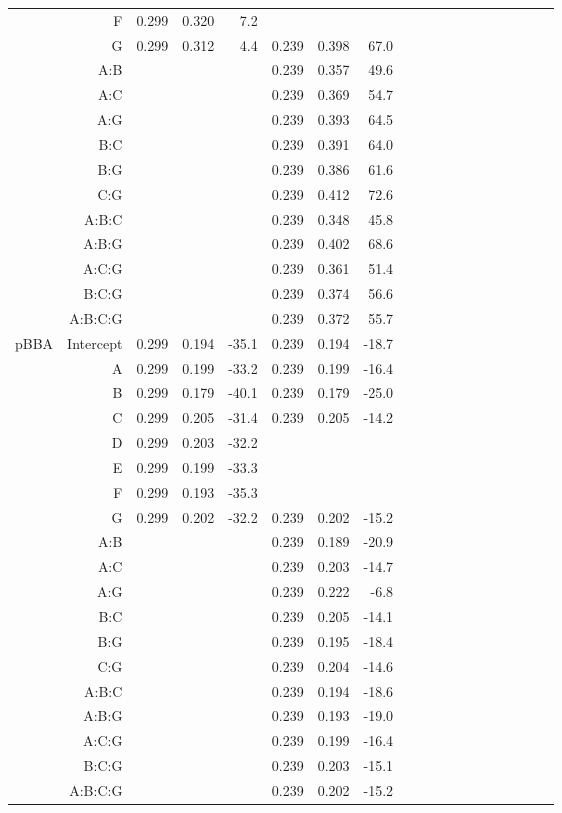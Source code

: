 \begin{table}
\begin{tabular}{lrrrrrrrrrrrrrrrrrr}
 & F & 0.299 & 0.320 & 7.2 &  &  &  \\
 & G & 0.299 & 0.312 & 4.4 & 0.239 & 0.398 & 67.0 \\
 & A:B &  &  &  & 0.239 & 0.357 & 49.6 \\
 & A:C &  &  &  & 0.239 & 0.369 & 54.7 \\
 & A:G &  &  &  & 0.239 & 0.393 & 64.5 \\
 & B:C &  &  &  & 0.239 & 0.391 & 64.0 \\
 & B:G &  &  &  & 0.239 & 0.386 & 61.6 \\
 & C:G &  &  &  & 0.239 & 0.412 & 72.6 \\
 & A:B:C &  &  &  & 0.239 & 0.348 & 45.8 \\
 & A:B:G &  &  &  & 0.239 & 0.402 & 68.6 \\
 & A:C:G &  &  &  & 0.239 & 0.361 & 51.4 \\
 & B:C:G &  &  &  & 0.239 & 0.374 & 56.6 \\
 & A:B:C:G &  &  &  & 0.239 & 0.372 & 55.7 \\
\multirow[c]{19}{*}{pBBA} & Intercept & 0.299 & 0.194 & -35.1 & 0.239 & 0.194 & -18.7 \\
 & A & 0.299 & 0.199 & -33.2 & 0.239 & 0.199 & -16.4 \\
 & B & 0.299 & 0.179 & -40.1 & 0.239 & 0.179 & -25.0 \\
 & C & 0.299 & 0.205 & -31.4 & 0.239 & 0.205 & -14.2 \\
 & D & 0.299 & 0.203 & -32.2 &  &  &  \\
 & E & 0.299 & 0.199 & -33.3 &  &  &  \\
 & F & 0.299 & 0.193 & -35.3 &  &  &  \\
 & G & 0.299 & 0.202 & -32.2 & 0.239 & 0.202 & -15.2 \\
 & A:B &  &  &  & 0.239 & 0.189 & -20.9 \\
 & A:C &  &  &  & 0.239 & 0.203 & -14.7 \\
 & A:G &  &  &  & 0.239 & 0.222 & -6.8 \\
 & B:C &  &  &  & 0.239 & 0.205 & -14.1 \\
 & B:G &  &  &  & 0.239 & 0.195 & -18.4 \\
 & C:G &  &  &  & 0.239 & 0.204 & -14.6 \\
 & A:B:C &  &  &  & 0.239 & 0.194 & -18.6 \\
 & A:B:G &  &  &  & 0.239 & 0.193 & -19.0 \\
 & A:C:G &  &  &  & 0.239 & 0.199 & -16.4 \\
 & B:C:G &  &  &  & 0.239 & 0.203 & -15.1 \\
 & A:B:C:G &  &  &  & 0.239 & 0.202 & -15.2 \\
\bottomrule
\end{tabular}
\end{table}
